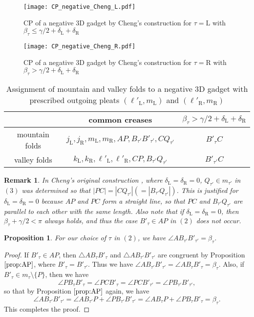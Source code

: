 \documentclass[11pt]{amsart}
\newtheorem{proposition}[theorem]{Proposition}
\newtheorem{remark}[theorem]{Remark}
\numberwithin{equation}{section}
\numberwithin{theorem}{section}
\newcommand{\Lt}{\ensuremath{\mathrm{L}}}
\newcommand{\Rt}{\ensuremath{\mathrm{R}}}
\newcommand{\norm}[1]{\ensuremath{\left| #1 \right|}}
\begin{document}
\begin{figure}[htbp]
\addtocounter{theorem}{1}
\centering\texttt{[image: CP\_negative\_Cheng\_L.pdf]}
    \caption{CP of a negative $3$D gadget by Cheng's construction for $\tau =\Lt$ with $\beta_\tau\leqslant\gamma /2+\delta_\Lt +\delta_\Rt$}
    \label{fig:CP_negative_Cheng_L}
\end{figure}
\begin{figure}[htbp]
\addtocounter{theorem}{1}
\centering\texttt{[image: CP\_negative\_Cheng\_R.pdf]}
    \caption{CP of a negative $3$D gadget by Cheng's construction for $\tau =\Rt$ with $\beta_\tau >\gamma /2+\delta_\Lt +\delta_\Rt$}
    \label{fig:CP_negative_Cheng_R}
\end{figure}
\addtocounter{theorem}{1}
\begin{table}[h]
\begin{tabular}{c|c|c}
&common creases&$\beta_\tau >\gamma /2+\delta_\Lt +\delta_\Rt$\\ \hline
mountain folds&$j_\Lt ,j_\Rt ,m_\Lt ,m_\Rt ,AP,B_{\tau'}B'_{\tau'},CQ_{\tau'}$&$B'_\tau C$\\ \hline
valley folds&$k_\Lt ,k_\Rt ,\ell'_\Lt ,\ell'_\Rt ,CP,B_{\tau'}Q_{\tau'}$&$B'_{\tau'}C$
\end{tabular}\vspace{0.5cm}
\caption{Assignment of mountain and valley folds to a negative $3$D gadget with prescribed outgoing pleats $(\ell'_\Lt ,m_\Lt )$ and $(\ell'_\Rt ,m_\Rt )$}
\label{tbl:assignment_negative_Cheng}
\end{table}
\begin{remark}\rm
In Cheng's original construction \cite{Cheng}, where $\delta_\Lt =\delta_\Rt =0$, 
$Q_{\tau'}\in m_{\tau'}$ in $(3)$ was determined so that $\norm{PC}=\norm{CQ_{\tau'}}(=\norm{B_{\tau'}Q_{\tau'}})$.
This is justified for $\delta_\Lt =\delta_\Rt =0$ because $AP$ and $PC$ form a straight line,
so that $PC$ and $B_{\tau'}Q_{\tau'}$ are parallel to each other with the same length.
Also note that if $\delta_\Lt =\delta_\Rt =0$, then $\beta_\tau +\gamma /2<\pi$ always holds, and thus the case $B'_\tau\in AP$ in $(2)$ does not occur.
\end{remark}
\begin{proposition}
For our choice of $\tau$ in $(2)$, we have $\angle AB_{\tau'}B'_{\tau'}=\beta_\tau$.
\end{proposition}
\begin{proof}
If $B'_\tau\in AP$, then $\triangle AB_\tau B'_\tau$ and $\triangle AB_{\tau'}B'_{\tau'}$ are congruent by Proposition $\ref{prop:AP}$, 
where $B'_\tau =B'_{\tau'}$.
Thus we have $\angle AB_{\tau'}B'_{\tau'}=\angle AB_\tau B'_\tau =\beta_\tau$.
Also, if $B'_\tau\in m_\tau\setminus\{ P\}$, then we have
\begin{equation*}
\angle PB_\tau B'_\tau =\angle PCB'_\tau =\angle PCB'_{\tau'}=\angle PB_{\tau'}B'_{\tau'},
\end{equation*}
so that by Proposition $\ref{prop:AP}$ again, we have
\begin{equation*}
\angle AB_{\tau'}B'_{\tau'}=\angle AB_{\tau'}P+\angle PB_{\tau'}B'_{\tau'}=\angle AB_\tau P+\angle PB_\tau B'_\tau =\beta_\tau .
\end{equation*}
This completes the proof.
\end{proof}
\end{document}
